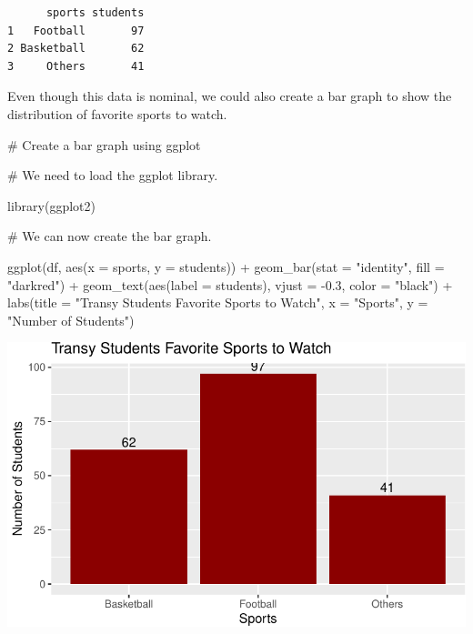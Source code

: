 \documentclass[
  letterpaper,
  DIV=11,
  numbers=noendperiod]{scrreprt}
\newenvironment{Shaded}{\begin{snugshade}}{\end{snugshade}}
\newcommand{\AttributeTok}[1]{\textcolor[rgb]{0.40,0.45,0.13}{#1}}
\newcommand{\CommentTok}[1]{\textcolor[rgb]{0.37,0.37,0.37}{#1}}
\newcommand{\FloatTok}[1]{\textcolor[rgb]{0.68,0.00,0.00}{#1}}
\newcommand{\FunctionTok}[1]{\textcolor[rgb]{0.28,0.35,0.67}{#1}}
\newcommand{\NormalTok}[1]{\textcolor[rgb]{0.00,0.23,0.31}{#1}}
\newcommand{\SpecialCharTok}[1]{\textcolor[rgb]{0.37,0.37,0.37}{#1}}
\newcommand{\StringTok}[1]{\textcolor[rgb]{0.13,0.47,0.30}{#1}}
\begin{document}
\begin{verbatim}
      sports students
1   Football       97
2 Basketball       62
3     Others       41
\end{verbatim}

Even though this data is nominal, we could also create a bar graph to
show the distribution of favorite sports to watch.

\begin{Shaded}
\begin{Highlighting}[]
\CommentTok{\# Create a bar graph using ggplot}

\CommentTok{\# We need to load the ggplot library.}

\FunctionTok{library}\NormalTok{(ggplot2)}

\CommentTok{\# We can now create the bar graph.}

\FunctionTok{ggplot}\NormalTok{(df, }\FunctionTok{aes}\NormalTok{(}\AttributeTok{x =}\NormalTok{ sports, }\AttributeTok{y =}\NormalTok{ students)) }\SpecialCharTok{+} 
  \FunctionTok{geom\_bar}\NormalTok{(}\AttributeTok{stat =} \StringTok{"identity"}\NormalTok{, }\AttributeTok{fill =} \StringTok{"darkred"}\NormalTok{) }\SpecialCharTok{+}
  \FunctionTok{geom\_text}\NormalTok{(}\FunctionTok{aes}\NormalTok{(}\AttributeTok{label =}\NormalTok{ students), }\AttributeTok{vjust =} \SpecialCharTok{{-}}\FloatTok{0.3}\NormalTok{, }\AttributeTok{color =} \StringTok{"black"}\NormalTok{) }\SpecialCharTok{+}
  \FunctionTok{labs}\NormalTok{(}\AttributeTok{title =} \StringTok{"Transy Students Favorite Sports to Watch"}\NormalTok{, }
       \AttributeTok{x =} \StringTok{"Sports"}\NormalTok{, }\AttributeTok{y =} \StringTok{"Number of Students"}\NormalTok{)}
\end{Highlighting}
\end{Shaded}

\includegraphics{Qualitative_and_Quantitative_Variables_files/figure-pdf/unnamed-chunk-2-1.pdf}
\end{document}
